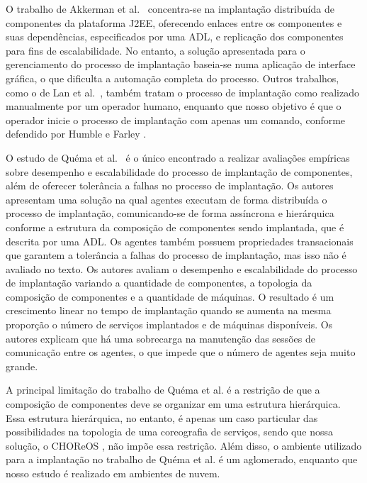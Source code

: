 O trabalho de Akkerman et al.~\cite{Akkerman2005J2EE} concentra-se na implantação distribuída de componentes da plataforma J2EE, oferecendo enlaces entre os componentes e suas dependências, especificados por uma ADL, e replicação dos componentes para fins de escalabilidade. No entanto, a solução apresentada para o gerenciamento do processo de implantação baseia-se numa aplicação de interface gráfica, o que dificulta a automação completa do processo. Outros trabalhos, como o de Lan et al.~\cite{Lan2005Architecture}, também tratam o processo de implantação como realizado manualmente por um operador humano, enquanto que nosso objetivo é que o operador inicie o processo de implantação com apenas um comando, conforme defendido por Humble e Farley \cite{Humble2011Continuous}.

O estudo de Quéma et al.~\cite{quema2004hierarchical} é o único encontrado a realizar avaliações empíricas sobre desempenho e escalabilidade do processo de implantação de componentes, além de oferecer tolerância a falhas no processo de implantação. Os autores apresentam uma solução na qual agentes executam de forma distribuída o processo de implantação, comunicando-se de forma assíncrona e hierárquica conforme a estrutura da composição de componentes sendo implantada, que é descrita por uma ADL. Os agentes também possuem propriedades transacionais que garantem a tolerância a falhas do processo de implantação, mas isso não é avaliado no texto. 
Os autores avaliam o desempenho e escalabilidade do processo de implantação variando a quantidade de componentes, a topologia da composição de componentes e a quantidade de máquinas. O resultado é um crescimento linear no tempo de implantação quando se aumenta na mesma proporção o número de serviços implantados e de máquinas disponíveis. Os autores explicam que há uma sobrecarga na manutenção das sessões de comunicação entre os agentes, o que impede que o número de agentes seja muito grande. 

A principal limitação do trabalho de Quéma et al. é a restrição de que a composição de componentes deve se organizar em uma estrutura hierárquica. Essa estrutura hierárquica, no entanto, é apenas um caso particular das possibilidades na topologia de uma coreografia de serviços, sendo que nossa solução, o CHOReOS \ee, não impõe essa restrição. Além disso, o ambiente utilizado para a implantação no trabalho de Quéma et al. é um aglomerado, enquanto que nosso estudo é realizado em ambientes de nuvem.

